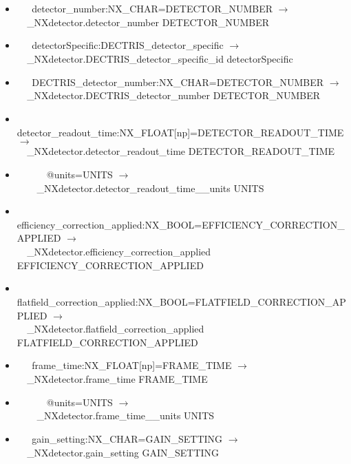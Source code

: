 \documentclass[11pt]{article}
\begin{document}
{{\begin{itemize}
\item{\verb|   |detector\_number:NX\_CHAR=DETECTOR\_NUMBER $\rightarrow$\\
\verb|  |\_NXdetector.detector\_number DETECTOR\_NUMBER}

\item{\verb|   |detectorSpecific:DECTRIS\_detector\_specific $\rightarrow$\\
\verb|  |\_NXdetector.DECTRIS\_detector\_specific\_id  detectorSpecific}

\item{\verb|   |DECTRIS\_detector\_number:NX\_CHAR=DETECTOR\_NUMBER $\rightarrow$\\
\verb|  |\_NXdetector.DECTRIS\_detector\_number DETECTOR\_NUMBER}

\item{\verb|   |detector\_readout\_time:NX\_FLOAT[np]=DETECTOR\_READOUT\_TIME $\rightarrow$\\
\verb|  |\_NXdetector.detector\_readout\_time DETECTOR\_READOUT\_TIME}

\item{\verb|      |@units=UNITS $\rightarrow$\\
\verb|    |\_NXdetector.detector\_readout\_time\_\_units UNITS}

\item{\verb|   |efficiency\_correction\_applied:NX\_BOOL=EFFICIENCY\_CORRECTION\_APPLIED $\rightarrow$\\
\verb|  |\_NXdetector.efficiency\_correction\_applied EFFICIENCY\_CORRECTION\_APPLIED}

\item{\verb|   |flatfield\_correction\_applied:NX\_BOOL=FLATFIELD\_CORRECTION\_APPLIED $\rightarrow$\\
\verb|  |\_NXdetector.flatfield\_correction\_applied FLATFIELD\_CORRECTION\_APPLIED}

\item{\verb|   |frame\_time:NX\_FLOAT[np]=FRAME\_TIME $\rightarrow$\\
\verb|  |\_NXdetector.frame\_time FRAME\_TIME}

\item{\verb|      |@units=UNITS $\rightarrow$\\
\verb|    |\_NXdetector.frame\_time\_\_units UNITS}

\item{\verb|   |gain\_setting:NX\_CHAR=GAIN\_SETTING $\rightarrow$\\
\verb|  |\_NXdetector.gain\_setting GAIN\_SETTING}


\end{itemize}}}
\end{document}
